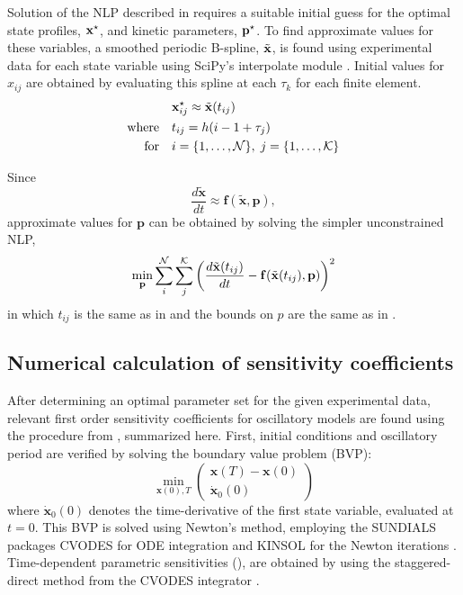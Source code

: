 Solution of the NLP described in  requires a suitable initial guess for the optimal state profiles, ${\mathbf{x}}^\star$, and kinetic parameters, ${\mathbf{p}}^\star$. 
To find approximate values for these variables, a smoothed periodic B-spline, $\tilde{\mathbf{x}}$, is found using experimental data for each state variable using SciPy's interpolate module \cite{Jones}. 
Initial values for $x_{ij}$ are obtained by evaluating this spline at each $\tau_k$ for each finite element.
\begin{equation} \label{eq:approxz}
  \begin{aligned} &{\mathbf{x}}^\star_{ij} \approx \tilde{\mathbf{x}}(t_{ij}) \\ 
    \textrm{where} \quad & t_{ij} = h(i - 1 + \tau_j) \\
    \textrm{for} \quad & i = \{1,\ldots,{\cal N}\},\; j = \{1,\ldots,{\cal K}\}
  \end{aligned}
\end{equation}

Since
\begin{equation}
  \frac{d\tilde{\bm x}}{dt} \approx {\bm f}(\tilde{\bm x},{\bm p}),
\end{equation}
approximate values for $\bm p$ can be obtained by solving the simpler unconstrained NLP,
\begin{equation}
  \min_{\mathbf{p}} \sum_i^{{\cal N}}\sum_j^{{\cal K}}\left(\frac{d\tilde{\mathbf{x}}(t_{ij})}{dt} - {\mathbf{f}}(\tilde{\mathbf{x}}(t_{ij}),{\mathbf{p}})\right)^2
\end{equation}
in which $t_{ij}$ is the same as in  and the bounds on $p$ are the same as in .

\subsection{Numerical calculation of sensitivity coefficients}

After determining an optimal parameter set for the given experimental data, relevant first order sensitivity coefficients for oscillatory models are found using the procedure from \cite{Wilkins2009}, summarized here. 
First, initial conditions and oscillatory period are verified by solving the boundary value problem (BVP):
\begin{equation} \label{eq:bvp}
  \min_{{\bm x}(0),T} \left(\begin{array}{c} {\bm x}(T) - {\bm x}(0) \\ \dot{{\bm x}}_0(0)
  \end{array}\right)     
\end{equation}
where $\dot{{\bm x}}_0(0)$ denotes the time-derivative of the first state variable, evaluated at $t=0$. 
This BVP is solved using Newton's method, employing the SUNDIALS packages CVODES for ODE integration and KINSOL for the Newton iterations \cite{Hindmarsh2005}.
Time-dependent parametric sensitivities (), are obtained by using the staggered-direct method from the CVODES integrator \cite{Serban2005}. 

